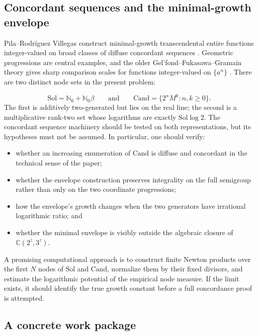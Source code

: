 \documentclass[10pt,letterpaper]{article}
\newcommand{\N}{\mathbb N}
\newcommand{\C}{\mathbb C}
\newcommand{\Sol}{\mathrm{Sol}}
\newcommand{\Cand}{\mathrm{Cand}}
\begin{document}
\subsection{Concordant sequences and the minimal-growth envelope}

Pila--Rodr\'iguez Villegas construct minimal-growth transcendental entire functions
integer-valued on broad classes of diffuse concordant sequences
\cite{PilaRodriguezVillegas}.  Geometric progressions are central examples, and the older
Gel'fond--Fukasawa--Gramain theory gives sharp comparison scales for functions integer-valued
on \(\{a^n\}\) \cite{Gramain1981,WaldschmidtIntegerValued}.  There are two distinct node sets
in the present problem:

\[
  \Sol=\N_0+\N_0\beta
  \qquad\text{and}\qquad
  \Cand=\{2^nM^k:n,k\geq0\}.
\]
The first is additively two-generated but lies on the real line; the second is a
multiplicative rank-two set whose logarithms are exactly \(\Sol\log2\).  The concordant
sequence machinery should be tested on both representations, but its hypotheses must not be
assumed.  In particular, one should verify:

\begin{itemize}
\item whether an increasing enumeration of \(\Cand\) is diffuse and concordant in the
technical sense of the paper;
\item whether the envelope construction preserves integrality on the full semigroup rather
than only on the two coordinate progressions;
\item how the envelope's growth changes when the two generators have irrational logarithmic
ratio; and
\item whether the minimal envelope is visibly outside the algebraic closure of
\(\C(2^z,3^z)\).
\end{itemize}

A promising computational approach is to construct finite Newton products over the first
\(N\) nodes of \(\Sol\) and \(\Cand\), normalize them by their fixed divisors, and estimate
the logarithmic potential of the empirical node measure.  If the limit exists, it should
identify the true growth constant before a full concordance proof is attempted.

\subsection{A concrete work package}
\end{document}
